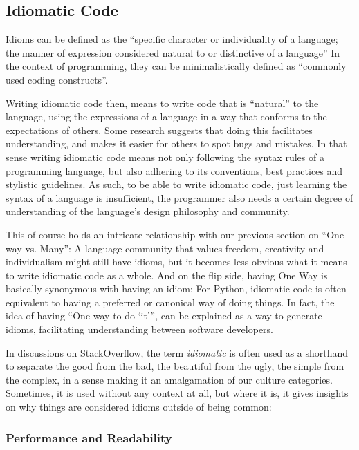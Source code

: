 \subsection{Idiomatic Code}
\label{sec:5.2}

Idioms can be defined as the “specific character or individuality of a language; the manner of expression considered
natural to or distinctive of a language”\cite{ox_dict_idiom} In the context of programming, they can be minimalistically defined as
“commonly used coding constructs”.\cite{ajami_syntax_2019}

Writing idiomatic code then, means to write code that is “natural” to the language, using the expressions of a language
in a way that conforms to the expectations of others. Some research suggests that doing this facilitates understanding,
and makes it easier for others to spot bugs and mistakes.\cite{hansen_what_2013} In that sense writing idiomatic code means not only following
the syntax rules of a programming language, but also adhering to its conventions, best practices and stylistic guidelines.
As such, to be able to write idiomatic code, just learning the syntax of a language is insufficient, the programmer also
needs a certain degree of understanding of the language’s design philosophy and community.

This of course holds an intricate relationship with our previous section on “One way vs. Many”: A language community that
values freedom, creativity and individualism might still have idioms, but it becomes less obvious what it means to write
idiomatic code as a whole. And on the flip side, having One Way is basically synonymous with having an idiom: For Python,
idiomatic code is often equivalent to having a preferred or canonical way of doing things. In fact, the idea of having
“One way to do ‘it’”, can be explained as a way to generate idioms, facilitating understanding between software developers.

In discussions on StackOverflow, the term \textit{idiomatic} is often used as a shorthand to separate the good from the bad,
the beautiful from the ugly, the simple from the complex, in a sense making it an amalgamation of our culture categories.
Sometimes, it is used without any context at all, but where it is, it gives insights on why things are considered idioms
outside of being common:

\subsubsection{Performance and Readability}


